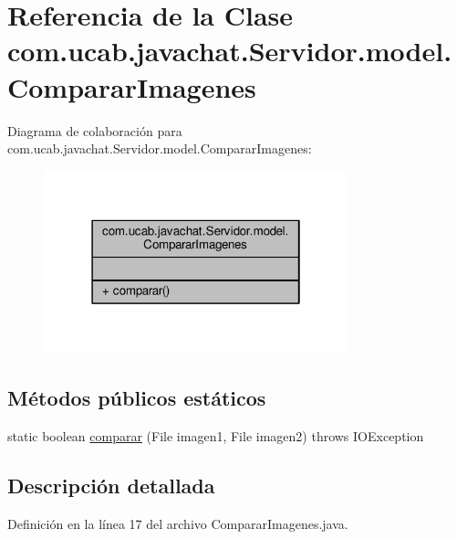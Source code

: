 \hypertarget{classcom_1_1ucab_1_1javachat_1_1_servidor_1_1model_1_1_comparar_imagenes}{\section{Referencia de la Clase com.\-ucab.\-javachat.\-Servidor.\-model.\-Comparar\-Imagenes}
\label{classcom_1_1ucab_1_1javachat_1_1_servidor_1_1model_1_1_comparar_imagenes}
}


Diagrama de colaboración para com.\-ucab.\-javachat.\-Servidor.\-model.\-Comparar\-Imagenes\-:\nopagebreak
\begin{figure}[H]
\begin{center}
\leavevmode
\includegraphics[width=250pt]{classcom_1_1ucab_1_1javachat_1_1_servidor_1_1model_1_1_comparar_imagenes__coll__graph}
\end{center}
\end{figure}
\subsection*{Métodos públicos estáticos}
\begin{DoxyCompactItemize}
\item 
static boolean \hyperlink{classcom_1_1ucab_1_1javachat_1_1_servidor_1_1model_1_1_comparar_imagenes_a35bd16d8d9c4c2bd3148cc5f1918f349}{comparar} (File imagen1, File imagen2)  throws I\-O\-Exception 	
\end{DoxyCompactItemize}


\subsection{Descripción detallada}


Definición en la línea 17 del archivo Comparar\-Imagenes.\-java.



